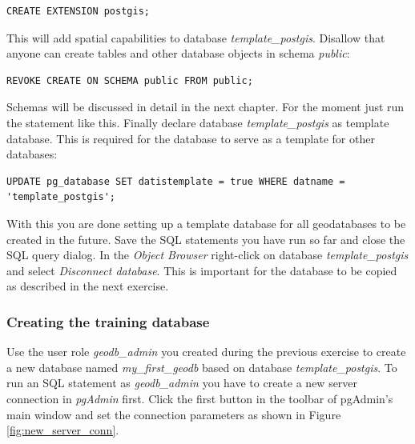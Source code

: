 \documentclass[a4paper,12pt,titlepage]{article}
\begin{document}
\begin{lstlisting}[caption={Creating the PostGIS extension}]
CREATE EXTENSION postgis;
\end{lstlisting}

This will add spatial capabilities to database \textit{template\_postgis}. Disallow that anyone can create tables and other database objects in schema \textit{public}:

\begin{lstlisting}[caption={Revoking a privilege}]
REVOKE CREATE ON SCHEMA public FROM public;
\end{lstlisting}

Schemas will be discussed in detail in the next chapter. For the moment just run the statement like this. Finally declare database \textit{template\_postgis} as template database. This is required for the database to serve as a template for other databases:

\begin{lstlisting}[caption={Declaring a template database}]
UPDATE pg_database SET datistemplate = true WHERE datname = 'template_postgis';
\end{lstlisting}

With this you are done setting up a template database for all geodatabases to be created in the future.
Save the SQL statements you have run so far and close the SQL query dialog. In the \textit{Object Browser} right-click on database \textit{template\_postgis} and select \textit{Disconnect database}. This is important for the database to be copied as described in the next exercise.

\subsubsection{Creating the training database}

Use the user role \textit{geodb\_admin} you created during the previous exercise to create a new database named \textit{my\_first\_geodb} based on database \textit{template\_postgis}. To run an SQL statement as \textit{geodb\_admin} you have to create a new server connection in \textit{pgAdmin} first. Click the first button in the toolbar of pgAdmin's main window and set the connection parameters as shown in Figure \ref{fig:new_server_conn}.
\end{document}
